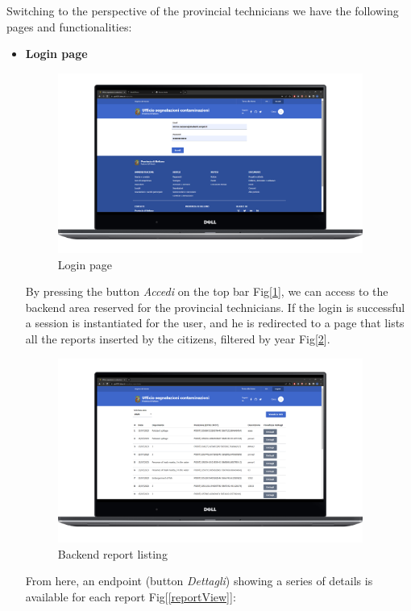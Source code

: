 \pagebreak
Switching to the perspective of the provincial technicians we have the following pages and functionalities:
\begin{itemize}
    \item \textbf{Login page} \\
    \begin{figure}[H]\centering \includegraphics[width=27em]{img/login.png} \caption{Login page} \label{login} \end{figure}
    By pressing the button \textit{Accedi} on the top bar Fig[\ref{login}], we can access to the backend area reserved for the provincial technicians.
    If the login is successful a session is instantiated for the user, and he is redirected to a page that lists all the reports inserted by the citizens, filtered by year Fig[\ref{backendListing}].
    \begin{figure}[H] \centering \includegraphics[width=27em]{img/home_back.png} \caption{Backend report listing} \label{backendListing}\end{figure}
    From here, an endpoint (button \textit{Dettagli}) showing a series of details is available for each report Fig[\ref{reportView}]:

\end{itemize}
